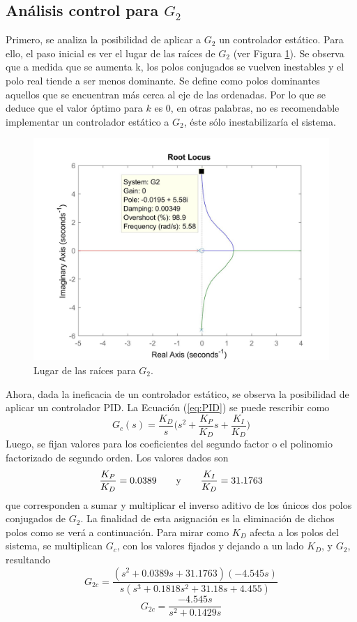\documentclass[journal]{IEEEtran}
\begin{document}
\subsection{Análisis control para $G_2$}
Primero, se analiza la posibilidad de aplicar a $G_2$ un controlador estático. Para ello, el paso inicial es ver el lugar de las raíces de $G_2$ (ver Figura \ref{fig:rlocusG2}). Se observa que a medida que se aumenta k, los polos conjugados se  vuelven inestables y el polo real tiende a ser menos dominante. Se define como polos dominantes aquellos que se encuentran más cerca al eje de las ordenadas. Por lo que se deduce que el valor óptimo para $k$ es 0, en otras palabras, no es recomendable implementar un controlador estático a $G_2$, éste sólo inestabilizaría el sistema.\\

\begin{figure}[h!]
\caption{Lugar de las raíces para $G_2$.\label{fig:rlocusG2}}
  \centering
\includegraphics[scale=0.18]{control/k_G2.jpg}
\end{figure}

Ahora, dada la ineficacia de un controlador estático, se observa la posibilidad de aplicar un controlador PID. La Ecuación (\ref{eq:PID}) se puede rescribir como $$G_c(s) = \dfrac{K_D}{s}\bigg(s^2+\dfrac{K_P}{K_D}s+\dfrac{K_I}{K_D}\bigg)$$
Luego, se fijan valores para los coeficientes del segundo factor o el polinomio factorizado de segundo orden. Los valores dados son
$$\dfrac{K_P}{K_D} = 0.0389 \qquad \textnormal{y} \qquad \dfrac{K_I}{K_D} = 31.1763$$
que corresponden a sumar y multiplicar el inverso aditivo de los únicos dos polos conjugados de $G_2$. La finalidad de esta asignación es la eliminación de dichos polos como se verá a continuación. Para mirar como $K_D$ afecta a los polos del sistema, se multiplican $G_c$, con los valores fijados y dejando a un lado $K_D$, y $G_2$, resultando
$$G_{2c} = \dfrac{(s^2+0.0389s+31.1763)(-4.545 s)}{s(s^3 + 0.1818 s^2 + 31.18 s + 4.455)}$$
$$G_{2c} =  \dfrac{-4.545 s}{s^2 + 0.1429 s}$$\\
\end{document}

